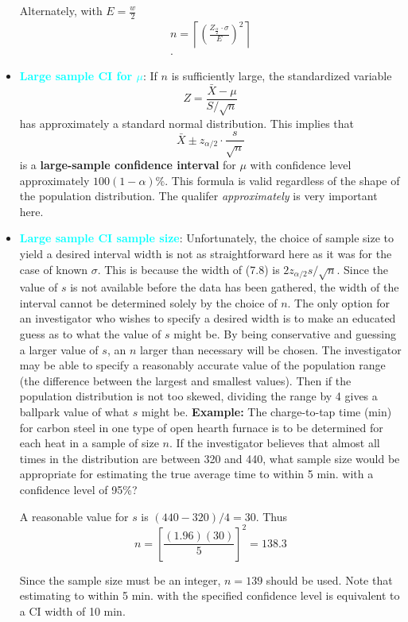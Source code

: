 \documentclass{report}
\begin{document}
\begin{itemize}
            \bigbreak \noindent 
            Alternately, with $E=\frac{w}{2} $
            \begin{align*}
                n = \left\lceil\left(\frac{Z_{\frac{\alpha}{2}} \cdot \sigma}{E}\right)^{2} \right\rceil \\
            .\end{align*}
        \item \textbf{\textcolor{cyan}{Large sample CI for $\mu$}}:
            If \( n \) is sufficiently large, the standardized variable
            \[
                Z = \frac{\bar{X} - \mu}{S/\sqrt{n}}
            \]
            has approximately a standard normal distribution. This implies that
            \[
                \bar{X} \pm z_{\alpha/2} \cdot \frac{s}{\sqrt{n}}
            \]
            is a \textbf{large-sample confidence interval} for \( \mu \) with confidence level approximately \( 100(1 - \alpha)\% \). This formula is valid regardless of the shape of the population distribution.
            \bigbreak \noindent 
            The qualifer \textit{approximately} is very important here.
        \item \textbf{\textcolor{cyan}{Large sample CI sample size}}:
            Unfortunately, the choice of sample size to yield a desired interval width is not
            as straightforward here as it was for the case of known \(\sigma\). This is because the width
            of (7.8) is \(2z_{\alpha/2}s/\sqrt{n}\). Since the value of \(s\) is not available before the data has been
            gathered, the width of the interval cannot be determined solely by the choice of \(n\). The
            only option for an investigator who wishes to specify a desired width is to make an
            educated guess as to what the value of \(s\) might be. By being conservative and guessing
            a larger value of \(s\), an \(n\) larger than necessary will be chosen. The investigator may
            be able to specify a reasonably accurate value of the population range (the difference
            between the largest and smallest values). Then if the population distribution is not too
            skewed, dividing the range by 4 gives a ballpark value of what \(s\) might be.
            \bigbreak \noindent 
            \textbf{Example:}
            The charge-to-tap time (min) for carbon steel in one type of open hearth furnace is
            to be determined for each heat in a sample of size \(n\). If the investigator believes that
            almost all times in the distribution are between 320 and 440, what sample size would
            be appropriate for estimating the true average time to within 5 min. with a confidence level of 95\%?
            \par
            A reasonable value for \(s\) is \((440 - 320)/4 = 30\). Thus
            \[
                n = \left[ \frac{(1.96)(30)}{5} \right]^2 = 138.3
            \]
            \par
            Since the sample size must be an integer, \(n = 139\) should be used. Note that estimating to within 5 min. with the specified confidence level is equivalent to a CI width of 10 min.


\end{itemize}
\end{document}
